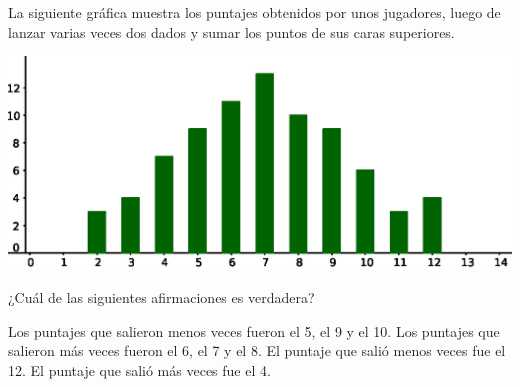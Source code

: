 \documentclass[10pt,addpoints]{exam}
\begin{document}
\begin{multicols}{2}
\begin{questions}
\begin{oneparchoices}
\end{oneparchoices}
\question
La siguiente gráfica muestra los puntajes obtenidos por unos jugadores, luego de lanzar varias veces dos dados y sumar los puntos de sus caras superiores.
\begin{center}
  \includegraphics[scale=.4]{Images/diag-barras.eps} 
\end{center}
¿Cuál de las siguientes afirmaciones es verdadera?
\begin{choices}
\choice Los puntajes que salieron menos veces fueron el 5, el 9 y el 10.
\CorrectChoice Los puntajes que salieron más veces fueron el 6, el 7 y el 8.
\choice El puntaje que salió menos veces fue el 12.
\choice El puntaje que salió más veces fue el 4.
\end{choices}
\end{questions}
\end{multicols}
\end{document}
